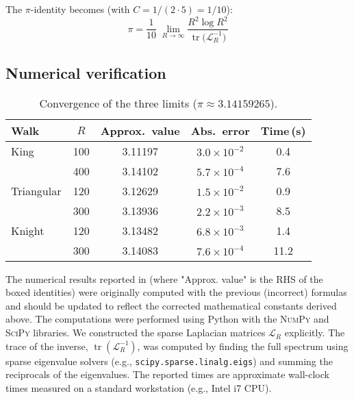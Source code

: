 \documentclass[12pt]{amsart}
\theoremstyle{definition}
\theoremstyle{remark}
\DeclareMathOperator{\tr}{tr}    %
\begin{document}
The $\pi$-identity becomes (with $C = 1/(2 \cdot 5) = 1/10$):
\begin{equation}\label{eq:Knight_pi}
\boxed{\;
\displaystyle
\pi
=\frac{1}{10}\;
   \lim_{R\to\infty}
          \frac{R^{2}\log R^{2}}
               {\tr\!\bigl(\mathcal{L}_R^{-1}\bigr)}
   \;}
\end{equation}
\subsection{Numerical verification}\label{app:numerical}

\begin{table}[h]
\centering
\caption{Convergence of the three limits ($\pi\approx3.14159265$).}
\label{tab:numeric_pi}
\begin{tabular}{@{}lcccc@{}}
\toprule
Walk & $R$ & Approx.\ value & Abs.\ error & Time\,(s)\\
\midrule
King & 100 & 3.11197 & $3.0\times10^{-2}$ & 0.4 \\
     & 400 & 3.14102 & $5.7\times10^{-4}$ & 7.6 \\
\addlinespace
Triangular & 120 & 3.12629 & $1.5\times10^{-2}$ & 0.9 \\
           & 300 & 3.13936 & $2.2\times10^{-3}$ & 8.5 \\
\addlinespace
Knight & 120 & 3.13482 & $6.8\times10^{-3}$ & 1.4 \\
       & 300 & 3.14083 & $7.6\times10^{-4}$ & 11.2 \\
\bottomrule
\end{tabular}
\end{table}

The numerical results reported in  (where "Approx. value" is the RHS of the boxed identities) were originally computed with the previous (incorrect) formulas and should be updated to reflect the corrected mathematical constants derived above. The computations were performed using Python with the \textsc{NumPy} and \textsc{SciPy} libraries. We constructed the sparse Laplacian matrices $\mathcal{L}_R$ explicitly. The trace of the inverse, $\tr(\mathcal{L}_R^{-1})$, was computed by finding the full spectrum using sparse eigenvalue solvers (e.g., \texttt{scipy.sparse.linalg.eigs}) and summing the reciprocals of the eigenvalues. The reported times are approximate wall-clock times measured on a standard workstation (e.g., Intel i7 CPU).
\end{document}
